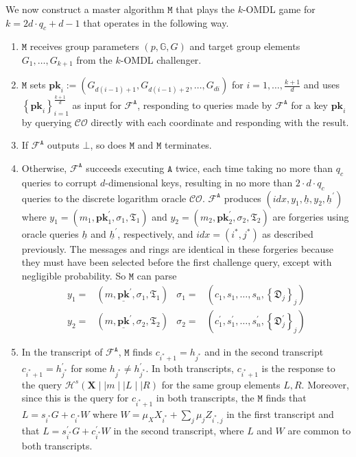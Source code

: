 \documentclass{article}
\theoremstyle{plain}
\theoremstyle{definition}
\begin{document}
We now construct a master algorithm $\texttt{M}$ that plays the $k$-OMDL game for $k=2d\cdot q_c + d-1$ that operates in the following way.
\begin{enumerate}

\item $\texttt{M}$ receives group parameters $(p, \mathbb{G}, G)$ and target group elements $G_1, \ldots, G_{k+1}$ from the $k$-OMDL challenger.

\item $\texttt{M}$ sets $\textbf{pk}_i := (G_{d(i-1) + 1}, G_{d(i-1) + 2}, \ldots, G_{di})$ for $i=1, \ldots, \frac{k+1}{d}$ and uses $\left\{\textbf{pk}_i\right\}_{i=1}^{\frac{k+1}{d}}$ as input for $\mathcal{F}^{\texttt{A}}$, responding to queries made by $\mathcal{F}^{\texttt{A}}$ for a key $\textbf{pk}_i$ by querying $\mathcal{CO}$ directly with each coordinate and responding with the result.

\item If $\mathcal{F}^{\texttt{A}}$ outputs $\bot$, so does $\texttt{M}$ and $\texttt{M}$ terminates.

\item Otherwise, $\mathcal{F}^{\texttt{A}}$ succeeds executing $\texttt{A}$ twice, each time taking no more than $q_c$ queries to corrupt $d$-dimensional keys, resulting in no more than $2\cdot d\cdot q_c$ queries to the discrete logarithm oracle $\mathcal{CO}$. $\mathcal{F}^{\texttt{A}}$ produces $(\textit{idx}, y_1, \underline{h}, y_2, \underline{h}^\prime)$ where $y_1 = (m_1, \textbf{pk}^{\prime}_1, \sigma_1, \mathfrak{T}_1)$ and $y_2 = (m_2, \textbf{pk}^{\prime}_2, \sigma_2, \mathfrak{T}_2)$ are forgeries using oracle queries $\underline{h}$ and $\underline{h}^\prime$, respectively, and $\textit{idx} = (i^*, j^*)$ as described previously. The messages and rings are identical in these forgeries because they must have been selected before the first challenge query, except with negligible probability. So $\texttt{M}$ can parse 
\begin{align*}
y_1 =& (m, \underline{\textbf{pk}}^\prime, \sigma_1, \mathfrak{T}_1) & \sigma_1 =& (c_1, s_1, \ldots, s_n, \left\{\mathfrak{D}_j\right\}_j) \\
y_2 =& (m, \underline{\textbf{pk}}^\prime, \sigma_2, \mathfrak{T}_2) & \sigma_2 =& (c_1^\prime, s_1^\prime, \ldots, s_n^\prime, \left\{\mathfrak{D}_j^\prime\right\}_j)\end{align*}


\item In the transcript of $\mathcal{F}^{\texttt{A}}$, $\texttt{M}$ finds $c_{i^*+1} = h_{j^*}$ and in the second transcript $c_{i^*+1} = h^\prime_{j^*}$ for some $h_{j^*} \neq h^\prime_{j^*}$. In both transcripts, $c_{i^*+1}$ is the response to the query $\mathcal{H}^s(\textbf{X} \mid \mid m \mid \mid L \mid \mid R)$ for the same group elements $L, R$. Moreover, since this is the query for $c_{i^*+1}$ in both transcripts, the  $\texttt{M}$ finds that $L = s_{i^*} G + c_{i^*} W$ where $W = \mu_X X_{i^*} + \sum_j \mu_j Z_{i^*, j}$ in the first transcript and that $L = s_{i^*}^\prime G + c_{i^*}^\prime W$ in the second transcript, where $L$ and $W$ are common to both transcripts.


\end{enumerate}
\end{document}

